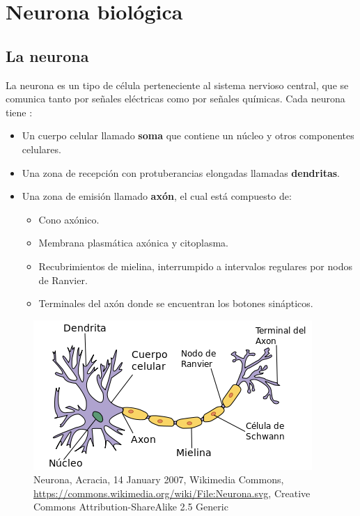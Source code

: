 \section{Neurona biológica}
\subsection{La neurona}

La neurona es un tipo de célula perteneciente al sistema nervioso central, que se comunica tanto por señales eléctricas como por señales químicas. Cada neurona tiene \parencite{sistemaNervioso}:%


 \begin{itemize}
	\item Un cuerpo celular llamado \textbf{soma} que contiene un núcleo y otros componentes celulares.
	\item Una zona de recepción con protuberancias elongadas llamadas \textbf{dendritas}.
	\item Una zona de emisión llamado \textbf{axón}, el cual está compuesto de:
		\begin {itemize}
			\item Cono axónico.
			\item Membrana plasmática axónica y citoplasma.
			\item Recubrimientos de mielina, interrumpido a intervalos regulares por nodos de Ranvier.
			\item Terminales del axón donde se encuentran los botones sinápticos. 
		\end{itemize}
 \end{itemize}


\begin{figure}[h]
 \centering
 \includegraphics[scale=0.6]{../Figuras/neuronaPartes.png}
 \caption{Neurona, Acracia, 14 January 2007, Wikimedia Commons, \url{https://commons.wikimedia.org/wiki/File:Neurona.svg}, Creative Commons Attribution-ShareAlike 2.5 Generic}
 \label{fig:neuronaP}
\end{figure}


